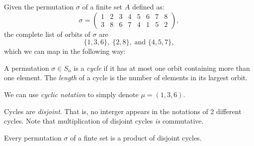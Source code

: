\begin{example}
    Given the permutation $\sigma$ of a finite set $A$ defined as:
    \[\sigma = \begin{pmatrix}
        1 & 2 & 3 & 4 & 5 & 6 & 7 & 8 \\ 3 & 8 & 6 & 7 & 4 & 1 & 5 & 2
    \end{pmatrix},\]
    the complete list of orbits of $\sigma$ are $$\{1,3,6\}, \; \{2,8\}, \; \text{and }\{4,5,7\},$$ which we can map in the following way:
    \begin{center}
    \end{center}
\end{example}
\begin{definition}
    A permutation $\sigma \in S_n$ is a \emph{cycle} if it has at most one orbit containing more than one element. The \emph{length} of a cycle is the number of elements in its largest orbit.  
\end{definition}
\begin{remark}
    We can use \emph{cyclic notation} to simply denote $\mu = (1,3,6)$.
\end{remark}
\begin{remark}
    Cycles are \emph{disjoint}. That is, no interger appears in the notations of 2 different cycles. Note that multiplication of disjoint cycles \emph{is} commutative.
\end{remark}
\begin{theorem}
    Every permutation $\sigma$ of a finte set is a product of disjoint cycles.
\end{theorem}
